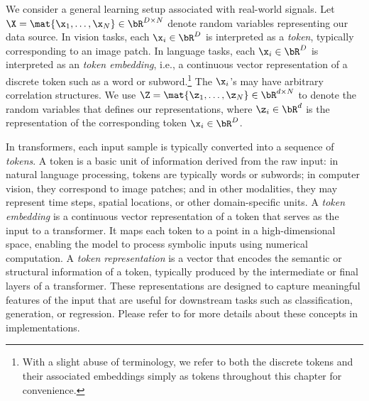 \documentclass[../../book-main.tex]{subfiles}
\begin{document}

We consider a general learning setup associated with real-world signals. Let \(\X = \mat{\x_{1}, \dots, \x_{N}} \in \bR^{D \times N}\) denote random variables representing our data source. In vision tasks, each \(\x_{i} \in \bR^{D}\) is interpreted as a \textit{token}, typically corresponding to an image patch. In language tasks, each \(\x_{i} \in \bR^{D}\) is interpreted as an \textit{token embedding}, i.e., a continuous vector representation of a discrete token such as a word or subword.\footnote{With a slight abuse of terminology, we refer to both the discrete tokens and their associated embeddings simply as tokens throughout this chapter for convenience.}  %
The \(\x_{i}\)'s may have arbitrary correlation structures. We use \(\Z = \mat{\z_{1}, \dots, \z_{N}} \in \bR^{d \times N}\) to denote the random variables that defines our representations, where \(\z_{i} \in \bR^{d}\) is the representation of the corresponding token \(\x_i \in \bR^{D}\).%

\begin{remark}
    In transformers, each input sample is typically converted into a sequence of {\em tokens}. A token is a basic unit of information derived from the raw input: in natural language processing, tokens are typically words or subwords; in computer vision, they correspond to image patches; and in other modalities, they may represent time steps, spatial locations, or other domain-specific units. A {\em token embedding} is a continuous vector representation of a token that serves as the input to a transformer. It maps each token to a point in a high-dimensional space, enabling the model to process symbolic inputs using numerical computation.
    A {\em token representation} is a vector that encodes the semantic or structural information of a token, typically produced by the intermediate or final layers of a transformer. These representations are designed to capture meaningful features of the input that are useful for downstream tasks such as classification, generation, or regression. Please refer to  for more details about these concepts in implementations. 
\end{remark}
\end{document}
